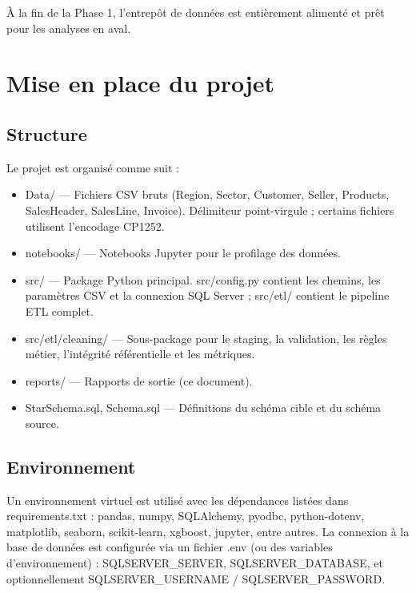 \documentclass[11pt,a4paper]{article}
\renewcommand{\texttt}[1]{{\ttfamily\small\colorbox{codebg}{\textcolor{darktext}{#1}}}}
\begin{document}
À la fin de la Phase 1, l'entrepôt de données est entièrement alimenté et prêt pour les analyses en aval.

\section{Mise en place du projet}

\subsection{Structure}

Le projet est organisé comme suit :
\begin{itemize}[noitemsep,leftmargin=1.2em]
  \item \texttt{Data/} --- Fichiers CSV bruts (Region, Sector, Customer, Seller, Products, SalesHeader, SalesLine, Invoice). Délimiteur point-virgule ; certains fichiers utilisent l'encodage CP1252.
  \item \texttt{notebooks/} --- Notebooks Jupyter pour le profilage des données.
  \item \texttt{src/} --- Package Python principal. \texttt{src/config.py} contient les chemins, les paramètres CSV et la connexion SQL Server ; \texttt{src/etl/} contient le pipeline ETL complet.
  \item \texttt{src/etl/cleaning/} --- Sous-package pour le staging, la validation, les règles métier, l'intégrité référentielle et les métriques.
  \item \texttt{reports/} --- Rapports de sortie (ce document).
  \item \texttt{StarSchema.sql}, \texttt{Schema.sql} --- Définitions du schéma cible et du schéma source.
\end{itemize}

\subsection{Environnement}

Un environnement virtuel est utilisé avec les dépendances listées dans \texttt{requirements.txt} : pandas, numpy, SQLAlchemy, pyodbc, python-dotenv, matplotlib, seaborn, scikit-learn, xgboost, jupyter, entre autres. La connexion à la base de données est configurée via un fichier \texttt{.env} (ou des variables d'environnement) : \texttt{SQLSERVER\_SERVER}, \texttt{SQLSERVER\_DATABASE}, et optionnellement \texttt{SQLSERVER\_USERNAME} / \texttt{SQLSERVER\_PASSWORD}.
\end{document}
